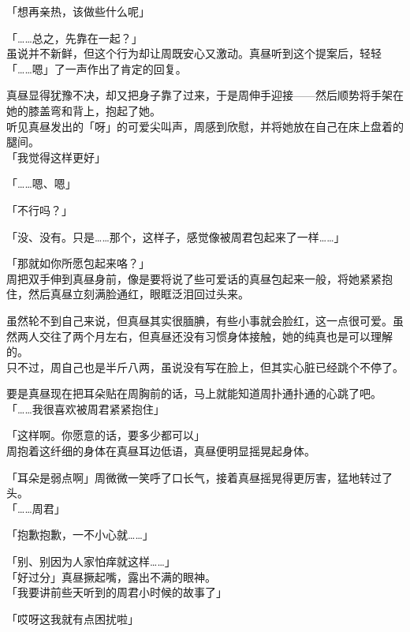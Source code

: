 「想再亲热，该做些什么呢」

「……总之，先靠在一起？」\\

虽说并不新鲜，但这个行为却让周既安心又激动。真昼听到这个提案后，轻轻「……嗯」了一声作出了肯定的回复。

真昼显得犹豫不决，却又把身子靠了过来，于是周伸手迎接——然后顺势将手架在她的膝盖弯和背上，抱起了她。\\

听见真昼发出的「呀」的可爱尖叫声，周感到欣慰，并将她放在自己在床上盘着的腿间。\\

「我觉得这样更好」

「……嗯、嗯」

「不行吗？」

「没、没有。只是……那个，这样子，感觉像被周君包起来了一样……」

「那就如你所愿包起来咯？」\\

周把双手伸到真昼身前，像是要将说了些可爱话的真昼包起来一般，将她紧紧抱住，然后真昼立刻满脸通红，眼眶泛泪回过头来。

虽然轮不到自己来说，但真昼其实很腼腆，有些小事就会脸红，这一点很可爱。虽然两人交往了两个月左右，但真昼还没有习惯身体接触，她的纯真也是可以理解的。\\

只不过，周自己也是半斤八两，虽说没有写在脸上，但其实心脏已经跳个不停了。

要是真昼现在把耳朵贴在周胸前的话，马上就能知道周扑通扑通的心跳了吧。\\

「……我很喜欢被周君紧紧抱住」

「这样啊。你愿意的话，要多少都可以」\\

周抱着这纤细的身体在真昼耳边低语，真昼便明显摇晃起身体。

「耳朵是弱点啊」周微微一笑呼了口长气，接着真昼摇晃得更厉害，猛地转过了头。\\

「……周君」

「抱歉抱歉，一不小心就……」

「别、别因为人家怕痒就这样……」\\

「好过分」真昼撅起嘴，露出不满的眼神。\\

「我要讲前些天听到的周君小时候的故事了」

「哎呀这我就有点困扰啦」\\

